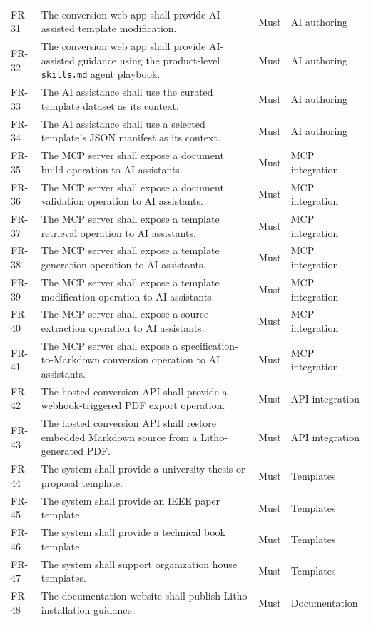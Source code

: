 \begin{xltabular}{\textwidth}{@{}p{0.12\textwidth}X p{0.15\textwidth}p{0.20\textwidth}@{}}
FR-31 & The conversion web app shall provide AI-assisted template modification. & Must & AI authoring \\
FR-32 & The conversion web app shall provide AI-assisted guidance using the product-level \texttt{skills.md} agent playbook. & Must & AI authoring \\
FR-33 & The AI assistance shall use the curated template dataset as its context. & Must & AI authoring \\
FR-34 & The AI assistance shall use a selected template's JSON manifest as its context. & Must & AI authoring \\
FR-35 & The MCP server shall expose a document build operation to AI assistants. & Must & MCP integration \\
FR-36 & The MCP server shall expose a document validation operation to AI assistants. & Must & MCP integration \\
FR-37 & The MCP server shall expose a template retrieval operation to AI assistants. & Must & MCP integration \\
FR-38 & The MCP server shall expose a template generation operation to AI assistants. & Must & MCP integration \\
FR-39 & The MCP server shall expose a template modification operation to AI assistants. & Must & MCP integration \\
FR-40 & The MCP server shall expose a source-extraction operation to AI assistants. & Must & MCP integration \\
FR-41 & The MCP server shall expose a specification-to-Markdown conversion operation to AI assistants. & Must & MCP integration \\
FR-42 & The hosted conversion API shall provide a webhook-triggered PDF export operation. & Must & API integration \\
FR-43 & The hosted conversion API shall restore embedded Markdown source from a Litho-generated PDF. & Must & API integration \\
FR-44 & The system shall provide a university thesis or proposal template. & Must & Templates \\
FR-45 & The system shall provide an IEEE paper template. & Must & Templates \\
FR-46 & The system shall provide a technical book template. & Must & Templates \\
FR-47 & The system shall support organization house templates. & Must & Templates \\
FR-48 & The documentation website shall publish Litho installation guidance. & Must & Documentation \\

\end{xltabular}
